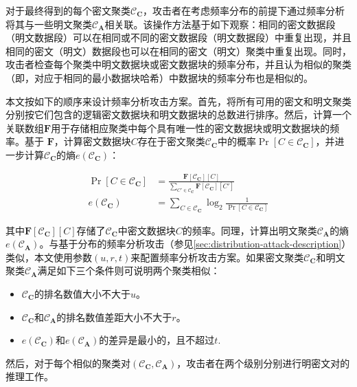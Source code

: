 对于最终得到的每个密文聚类$\mathcal{C}_\mathbf{C}$，攻击者在考虑频率分布的前提下通过频率分析将其与一些明文聚类$\mathcal{C}_\mathbf{A}$相关联。该操作方法基于如下观察：相同的密文数据段（明文数据段）可以在相同或不同的密文数据段（明文数据段）中重复出现，并且相同的密文（明文）数据段也可以在相同的密文（明文）聚类中重复出现。同时，攻击者检查每个聚类中明文数据块或密文数据块的频率分布，并且认为相似的聚类（即，对应于相同的最小数据块哈希）中数据块的频率分布也是相似的。
 
本文按如下的顺序来设计频率分析攻击方案。首先，将所有可用的密文和明文聚类分别按它们包含的逻辑密文数据块和明文数据块的总数进行排序。然后，计算一个关联数组$\mathbf{F}$用于存储相应聚类中每个具有唯一性的密文数据块或明文数据块的频率。基于 $\mathbf{F}$，计算密文数据块$C$存在于密文聚类$\mathcal{C}_\mathbf{C}$中的概率$\Pr[C \in \mathcal{C}_\mathbf{C}]$，并进一步计算$\mathcal{C}_\mathbf{C}$的熵$e(\mathcal{C}_\mathbf{C})$：     

\begin{equation}
\begin{aligned}
\label{eq:Pr&eincluster}
    \Pr[C \in \mathcal{C}_\mathbf{C}] &= \frac{\mathbf{F}[\mathcal{C}_\mathbf{C}][C]}{\sum_{C' \in \mathcal{C}_\mathbf{C}} \mathbf{F}[\mathcal{C}_\mathbf{C}][C']} \\
    e(\mathcal{C}_\mathbf{C}) &= \sum_{C \in \mathcal{C}_\mathbf{C}} \log_2 \frac{1}{\Pr[C \in \mathcal{C}_\mathbf{C}]} 
\end{aligned}
\end{equation}

其中$\mathbf{F}[\mathcal{C}_\mathbf{C}][C]$存储了$\mathcal{C}_\mathbf{C}$中密文数据块$C$的频率。同理，计算出明文聚类$\mathcal{C}_\mathbf{A}$的熵$e(\mathcal{C}_\mathbf{A})$。与基于分布的频率分析攻击（参见\ref{sec:distribution-attack-description}）类似，本文使用参数$(u, r, t)$来配置频率分析攻击方案。如果密文聚类$\mathcal{C}_\mathbf{C}$和明文聚类$\mathcal{C}_\mathbf{A}$满足如下三个条件则可说明两个聚类相似：   


\begin{itemize}
    \item  $\mathcal{C}_\mathbf{C}$的排名数值大小不大于$u$。
    \item  $\mathcal{C}_\mathbf{C}$和$\mathcal{C}_\mathbf{A}$的排名数值差距大小不大于$r$。  
    \item  $e(\mathcal{C}_\mathbf{C})$和$e(\mathcal{C}_\mathbf{A})$的差异是最小的，且不超过$t$.
\end{itemize}

然后，对于每个相似的聚类对$(\mathcal{C}_\mathbf{C}, \mathcal{C}_\mathbf{A})$，攻击者在两个级别分别进行明密文对的推理工作。


